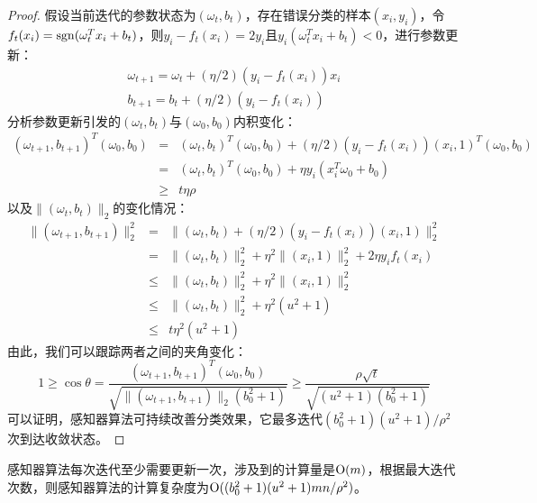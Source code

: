 \begin{proof}
假设当前迭代的参数状态为$(\omega_t,b_t)$，存在错误分类的样本$(x_i,y_i)$，令$f_t(x_i) = \operatorname{\mathrm{sgn}}(\omega_t^T x_i + b_t)$，则$y_i - f_t(x_i) = 2y_i$且$y_i (\omega_t^T x_i + b_t) < 0$，进行参数更新：
\begin{equation}
  \begin{array}{l}
    \omega_{t+1} = \omega_t + (\eta/2) (y_i - f_t(x_i)) x_i\\
    b_{t+1} = b_t + (\eta/2) (y_i - f_t(x_i))
  \end{array}
\end{equation}
分析参数更新引发的$(\omega_t,b_t)$与$(\omega_0,b_0)$内积变化：
\begin{equation}
    \begin{array}{lcl}
     (\omega_{t+1},b_{t+1})^T (\omega_0,b_0)  &= & (\omega_t,b_t)^T (\omega_0,b_0) + (\eta/2) (y_i - f_t(x_i)) (x_i, 1)^T (\omega_0,b_0) \\
      &= & (\omega_t,b_t)^T (\omega_0,b_0) + \eta y_i (x_i^T \omega_0 + b_0) \\
      &\ge & t\eta \rho
    \end{array}
\end{equation}
以及$\|(\omega_t,b_t)\|_2$的变化情况：
\begin{equation}
    \begin{array}{lcl}
      \|(\omega_{t+1},b_{t+1})\|_2^2  &= & \|(\omega_t,b_t) + (\eta/2) (y_i - f_t(x_i)) (x_i, 1)\|_2^2 \\
      & = & \|(\omega_t,b_t)\|_2^2 + \eta^2 \|(x_i, 1)\|_2^2 + 2\eta y_i f_t(x_i) \\
      & \le & \|(\omega_t,b_t)\|_2^2 + \eta^2 \|(x_i, 1)\|_2^2 \\
      & \le & \|(\omega_t,b_t)\|_2^2 + \eta^2 (u^2+1) \\
      & \le & t \eta^2 (u^2+1)
    \end{array}
\end{equation}
由此，我们可以跟踪两者之间的夹角变化：
\begin{equation}
    1 \ge \cos\theta = \frac{(\omega_{t+1},b_{t+1})^T (\omega_0,b_0)}{\sqrt{\|(\omega_{t+1},b_{t+1})\|_2 (b_0^2+1)}} \ge \frac{\rho\sqrt{t}}{\sqrt{(u^2 + 1)(b_0^2+1)}}
\end{equation}
可以证明，感知器算法可持续改善分类效果，它最多迭代$(b_0^2 + 1)(u^2+1)/\rho^2$次到达收敛状态。
\end{proof}

感知器算法每次迭代至少需要更新一次，涉及到的计算量是$\operatorname{\mathrm{O}}(m)$，根据最大迭代次数，则感知器算法的计算复杂度为$\operatorname{\mathrm{O}}((b_0^2 + 1)(u^2+1)mn/\rho^2)$。

